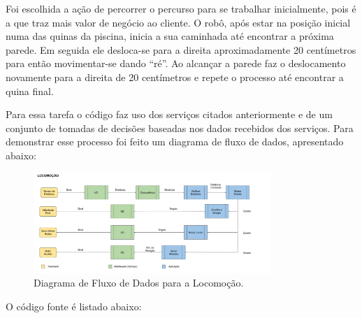 Foi escolhida a ação de percorrer o percurso para se trabalhar inicialmente, pois é a que traz mais valor de negócio ao cliente. O robô, após estar na posição inicial numa das quinas da piscina, inicia a sua caminhada até encontrar a próxima parede. Em seguida ele desloca-se para a direita aproximadamente 20 centímetros para então movimentar-se dando “ré”. Ao alcançar a parede faz o deslocamento novamente para a direita de 20 centímetros e repete o processo até encontrar a quina final.

Para essa tarefa o código faz uso dos serviços citados anteriormente e de um conjunto de tomadas de decisões baseadas nos dados recebidos dos serviços. Para demonstrar esse processo foi feito um diagrama de fluxo de dados, apresentado abaixo:
\par
\begin{figure}[h]
  \centering
  \includegraphics[width=0.8\textwidth]{figures/move-dfd.png}
  \caption{Diagrama de Fluxo de Dados para a Locomoção.}
  \label{fig:move-dfd}
\end{figure}
\FloatBarrier
\par
O código fonte é listado abaixo:

